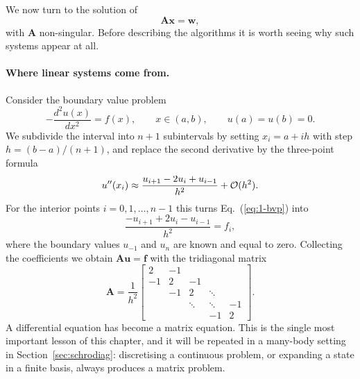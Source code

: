 We now turn to the solution of
\begin{equation}
  \bm{A}\bm{x} = \bm{w},
  \label{eq:1-linsys}
\end{equation}
with $\bm{A}$ non-singular.  Before describing the algorithms it is worth
seeing why such systems appear at all.

\paragraph{Where linear systems come from.}
Consider the boundary value problem
\begin{equation}
  -\frac{d^2u(x)}{dx^2} = f(x), \qquad x\in(a,b),
  \qquad u(a)=u(b)=0 .
  \label{eq:1-bvp}
\end{equation}
We subdivide the interval into $n+1$ subintervals by setting $x_i=a+ih$ with
step $h=(b-a)/(n+1)$, and replace the second derivative by the three-point
formula
\begin{equation}
  u''(x_i) \approx \frac{u_{i+1}-2u_i+u_{i-1}}{h^2} + \mathcal{O}(h^2).
  \label{eq:1-secondderiv}
\end{equation}
For the interior points $i=0,1,\dots,n-1$ this turns Eq.~(\ref{eq:1-bvp})
into
\begin{equation}
  \frac{-u_{i+1}+2u_i-u_{i-1}}{h^2} = f_i ,
  \label{eq:1-discbvp}
\end{equation}
where the boundary values $u_{-1}$ and $u_{n}$ are known and equal to zero.
Collecting the coefficients we obtain $\bm{A}\bm{u}=\bm{f}$ with the
tridiagonal matrix
\begin{equation}
  \bm{A} = \frac{1}{h^2}
  \begin{bmatrix}
     2 & -1 &    &        &    \\
    -1 &  2 & -1 &        &    \\
       & -1 &  2 & \ddots &    \\
       &    & \ddots & \ddots & -1 \\
       &    &    & -1 & 2
  \end{bmatrix} .
  \label{eq:1-laplacian}
\end{equation}
A differential equation has become a matrix equation.  This is the single
most important lesson of this chapter, and it will be repeated in a
many-body setting in Section~\ref{sec:schrodiag}: discretising a continuous
problem, or expanding a state in a finite basis, always produces a matrix
problem.

